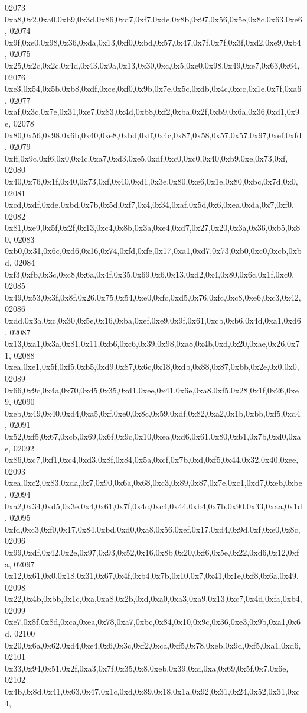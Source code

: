 \begin{DoxyCode}
02073   0xa8,0x2,0xa0,0xb9,0x3d,0x86,0xd7,0xf7,0xde,0x8b,0x97,0x56,0x5e,0x8c,0x63,0xe6,
02074   0x9f,0xe0,0x98,0x36,0xda,0x13,0xf0,0xbd,0x57,0x47,0x7f,0x7f,0x3f,0xd2,0xe9,0xb4,
02075   0x25,0x2c,0x2c,0x4d,0x43,0x9a,0x13,0x30,0xc,0x5,0xe0,0x98,0x49,0xe7,0x63,0x64,
02076   0xe3,0x54,0x5b,0xb8,0xdf,0xce,0xf0,0x9b,0x7e,0x5c,0xdb,0x4c,0xcc,0x1e,0x7f,0xa6,
02077   0xaf,0x3c,0x7e,0x31,0xe7,0x83,0x4d,0xb8,0xf2,0xba,0x2f,0xb9,0x6a,0x36,0xd1,0x9e,
02078   0x80,0x56,0x98,0x6b,0x40,0xe8,0xbd,0xff,0x4c,0x87,0x58,0x57,0x57,0x97,0xef,0xfd,
02079   0xff,0x9c,0xf6,0x0,0x4c,0xa7,0xd3,0xe5,0xdf,0xc0,0xc0,0x40,0xb9,0xe,0x73,0xf,
02080   0x40,0x76,0x1f,0x40,0x73,0xf,0x40,0xd1,0x3e,0x80,0xe6,0x1e,0x80,0xbc,0x7d,0x0,
02081   0xcd,0xdf,0xde,0xbd,0x7b,0x5d,0xf7,0x4,0x34,0xaf,0x5d,0x6,0xea,0xda,0x7,0xf0,
02082   0x81,0xe9,0x5f,0x2f,0x13,0xc4,0x8b,0x3a,0xe4,0xd7,0x27,0x20,0x3a,0x36,0xb5,0x80,
02083   0xb0,0x31,0x6c,0xd6,0x16,0x74,0xfd,0xfe,0x17,0xa1,0xd7,0x73,0xb0,0xc0,0xcb,0xbd,
02084   0xf3,0xfb,0x3c,0xc8,0x6a,0x4f,0x35,0x69,0x6,0x13,0xd2,0x4,0x80,0x6c,0x1f,0xc0,
02085   0x49,0x53,0x3f,0x8f,0x26,0x75,0x54,0xe0,0xfc,0xd5,0x76,0xfc,0xc8,0xe6,0xc3,0x42,
02086   0xdd,0x3a,0xc,0x30,0x5e,0x16,0xba,0xef,0xe9,0x9f,0x61,0xcb,0xb6,0x4d,0xa1,0xd6,
02087   0x13,0xa1,0x3a,0x81,0x11,0xb6,0xc6,0x39,0x98,0xa8,0x4b,0xd,0x20,0xae,0x26,0x71,
02088   0xea,0xe1,0x5f,0xf5,0xb5,0xd9,0x87,0x6c,0x18,0xdb,0x88,0x87,0xbb,0x2e,0x0,0x0,
02089   0x66,0x9c,0x4a,0x70,0xd5,0x35,0xd1,0xee,0x41,0x6e,0xa8,0xf5,0x28,0x1f,0x26,0xe9,
02090   0xeb,0x49,0x40,0xd4,0xa5,0xf,0xe0,0x8c,0x59,0xdf,0x82,0xa2,0x1b,0xbb,0xf5,0xd4,
02091   0x52,0xf5,0x67,0xcb,0x69,0x6f,0x9c,0x10,0xea,0xd6,0x61,0x80,0xb1,0x7b,0xd0,0xae,
02092   0x86,0xc7,0xf1,0xc4,0xd3,0x8f,0x84,0x5a,0xcf,0x7b,0xd,0xf5,0x44,0x32,0x40,0xee,
02093   0xea,0xc2,0x83,0xda,0x7,0x90,0x6a,0x68,0xc3,0x89,0x87,0x7e,0xc1,0xd7,0xeb,0xbe,
02094   0xa2,0x34,0xd5,0x3e,0x4,0x61,0x7f,0x4c,0xc4,0x44,0xb4,0x7b,0x90,0x33,0xaa,0x1d,
02095   0xfd,0xc3,0xf0,0x17,0x84,0xbd,0xd0,0xa8,0x56,0xef,0x17,0xd4,0x9d,0xf,0xe0,0x8c,
02096   0x99,0xdf,0x42,0x2e,0x97,0x93,0x52,0x16,0x8b,0x20,0xf6,0x5e,0x22,0xd6,0x12,0xfa,
02097   0x12,0x61,0x0,0x18,0x31,0x67,0x4f,0xb4,0x7b,0x10,0x7,0x41,0x1e,0xf8,0x6a,0x49,
02098   0x22,0x4b,0xbb,0x1c,0xa,0xa8,0x2b,0xd,0xa0,0xa3,0xa9,0x13,0xc7,0x4d,0xfa,0xb4,
02099   0xe7,0x8f,0x8d,0xca,0xea,0x78,0xa7,0xbc,0x84,0x10,0x9c,0x36,0xe3,0x9b,0xa1,0x6d,
02100   0x20,0x6a,0x62,0xd4,0xe4,0x6,0x3c,0xf2,0xca,0xf5,0x78,0xeb,0x9d,0xf5,0xa1,0xd6,
02101   0x33,0x94,0x51,0x2f,0xa3,0x7f,0x35,0x8,0xeb,0x39,0xd,0xa,0x69,0x5f,0x7,0x6e,
02102   0x4b,0x8d,0x41,0x63,0x47,0x1c,0xd,0x89,0x18,0x1a,0x92,0x31,0x24,0x52,0x31,0xc4,

\end{DoxyCode}
